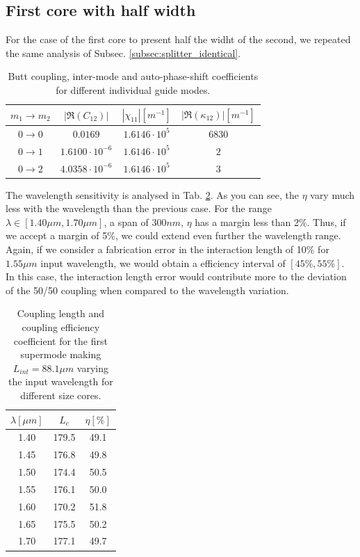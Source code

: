 \documentclass[conference, a4paper]{IEEEtran}
\begin{document}
\subsection{First core with half width}
\label{subsec:splitter_doubled}

For the case of the first core to present half the widht of the second, we repeated the same analysis of Subsec. \ref{subsec:splitter_identical}. 

\begin{table}[H]
    \centering
    \begin{tabular}{cccc}
        \toprule
        $m_1 \rightarrow m_2$ & $|\Re(C_{12})|$ & $|\chi_{11}| [m^{-1}]$ & $|\Re(\kappa_{12})| [m^{-1}]$ \\ 
        \midrule
        $0 \rightarrow 0$ & $0.0169$ & $1.6146 \cdot 10^5 $ & $6830$ \\
        $0 \rightarrow 1$ & $1.6100 \cdot 10^{-6}$ & $1.6146 \cdot 10^5 $ & $2$ \\
        $0 \rightarrow 2$ & $4.0358 \cdot 10^{-6}$ & $1.6146 \cdot 10^5 $ & $3$ \\
        \bottomrule
    \end{tabular}
    \caption{Butt coupling, inter-mode and auto-phase-shift coefficients for different individual guide modes.}
    \label{tab:splitter_identical_coefficients}
\end{table}

The wavelength sensitivity is analysed in Tab. \ref{tab:splitter_doubled_lc}. As you can see, the $\eta$ vary much less with the wavelength than the previous case. For the range $\lambda \in [1.40 \mu m, 1.70 \mu m]$, a span of $300nm$, $\eta$ has a margin less than 2\%. Thus, if we accept a margin of 5\%, we could extend even further the wavelength range. Again, if we consider a fabrication error in the interaction length of 10\% for $1.55\mu m$ input wavelength, we would obtain a efficiency interval of $[45\%, 55\%]$. In this case, the interaction length error would contribute more to the deviation of the 50/50 coupling when compared to the wavelength variation.

\begin{table}[H]
    \centering
    \begin{tabular}{ccc}
        \toprule
        $\lambda [\mu m]$ & $L_c$ & $\eta[\%]$ \\
        \midrule
        1.40 & 179.5 & 49.1 \\
        1.45 & 176.8 & 49.8 \\
        1.50 & 174.4 & 50.5 \\
        1.55 & 176.1 & 50.0 \\
        1.60 & 170.2 & 51.8 \\
        1.65 & 175.5 & 50.2 \\
        1.70 & 177.1 & 49.7 \\    
        \bottomrule
    \end{tabular}
    \caption{Coupling length and coupling efficiency coefficient for the first supermode making $L_{int} = 88.1\mu m$ varying the input wavelength for different size cores.}
    \label{tab:splitter_doubled_lc}
\end{table}
\end{document}
